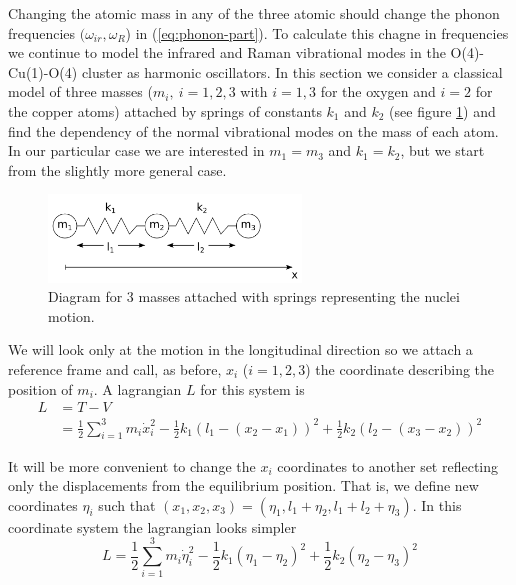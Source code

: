 Changing the atomic mass in any of the three atomic should change the phonon frequencies $(\omega_{ir},\omega_R$) in (\ref{eq:phonon-part}).
To calculate this chagne in frequencies we continue to model the infrared and Raman vibrational modes in the O(4)-Cu(1)-O(4) cluster as harmonic oscillators.
In this section we consider a classical model of three masses ($m_i,\ i=1,2,3$ with $i=1,3$ for the oxygen and $i=2$ for the copper atoms) attached by springs of constants $k_1$ and $k_2$ (see figure \ref{fig:3-masses-2-springs}) and find the dependency of the normal vibrational modes on the mass of each atom.
In our particular case we are interested in $m_1=m_3$ and $k_1=k_2$, but we start from the slightly more general case.

\begin{figure}[ht!]
  \centering
  \includegraphics[width=0.6\textwidth]{images/3-masses-2-springs-linear.png}
  \caption{Diagram for 3 masses attached with springs representing the nuclei motion.}
  \label{fig:3-masses-2-springs}
\end{figure}
%
We will look only at the motion in the longitudinal direction so we attach a reference frame and call, as before, $x_i$ ($i=1,2,3$) the coordinate describing the position of $m_i$.
A lagrangian $L$ for this system is 
%
\begin{align}
L & = T-V\\ 
  & = \frac{1}{2}\sum_{i=1}^3 m_i \dot{x}_i^2 - \frac{1}{2}k_1(l_1-(x_2-x_1))^2+\frac{1}{2}k_2(l_2-(x_3-x_2))^2
\end{align}

It will be more convenient to change the $x_i$ coordinates to another set reflecting only the displacements from the equilibrium position.
That is, we define new coordinates $\eta_i$ such that $(x_1,x_2,x_3)=(\eta_1,l_1+\eta_2,l_1+l_2+\eta_3)$. 
In this coordinate system the lagrangian looks simpler
%
\begin{equation}
  L= \frac{1}{2}\sum_{i=1}^3 m_i \dot{\eta}_i^2-\frac{1}{2}k_1(\eta_1-\eta_2)^2+\frac{1}{2}k_2(\eta_2-\eta_3)^2
\end{equation}

